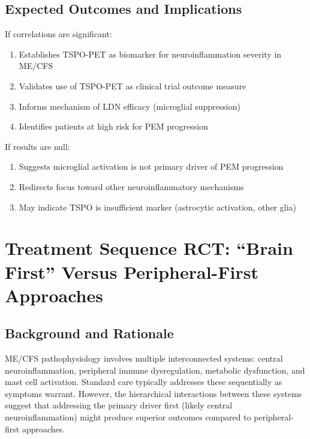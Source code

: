 \subsection{Expected Outcomes and Implications}

If correlations are significant:
\begin{enumerate}
    \item Establishes TSPO-PET as biomarker for neuroinflammation severity in ME/CFS
    \item Validates use of TSPO-PET as clinical trial outcome measure
    \item Informs mechanism of LDN efficacy (microglial suppression)
    \item Identifies patients at high risk for PEM progression
\end{enumerate}

If results are null:
\begin{enumerate}
    \item Suggests microglial activation is not primary driver of PEM progression
    \item Redirects focus toward other neuroinflammatory mechanisms
    \item May indicate TSPO is insufficient marker (astrocytic activation, other glia)
\end{enumerate}

\section{Treatment Sequence RCT: ``Brain First'' Versus Peripheral-First Approaches}
\label{sec:treatment-sequence-rct}

\subsection{Background and Rationale}

ME/CFS pathophysiology involves multiple interconnected systems: central neuroinflammation, peripheral immune dysregulation, metabolic dysfunction, and mast cell activation. Standard care typically addresses these sequentially as symptoms warrant. However, the hierarchical interactions between these systems suggest that addressing the primary driver first (likely central neuroinflammation) might produce superior outcomes compared to peripheral-first approaches.

